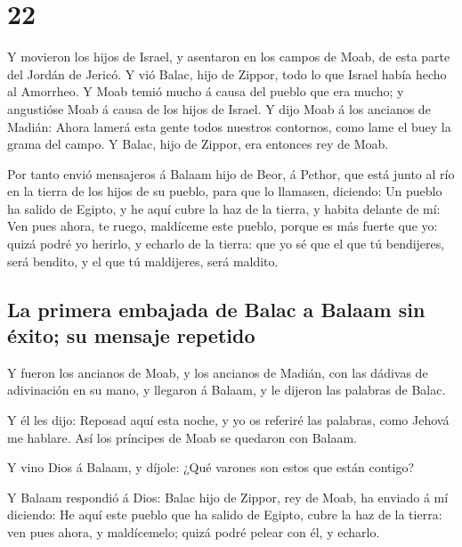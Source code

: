 \hypertarget{section-04-22}{%
\section{22}\label{section-04-22}}

 Y movieron los hijos de Israel, y asentaron en los campos
de Moab, de esta parte del Jordán de Jericó.  Y vió Balac,
hijo de Zippor, todo lo que Israel había hecho al Amorrheo.
 Y Moab temió mucho á causa del pueblo que era mucho; y
angustióse Moab á causa de los hijos de Israel.  Y dijo
Moab á los ancianos de Madián: Ahora lamerá esta gente todos nuestros
contornos, como lame el buey la grama del campo. Y Balac, hijo de
Zippor, era entonces rey de Moab.

 Por tanto envió mensajeros á Balaam hijo de Beor, á
Pethor, que está junto al río en la tierra de los hijos de su pueblo,
para que lo llamasen, diciendo: Un pueblo ha salido de Egipto, y he aquí
cubre la haz de la tierra, y habita delante de mí:  Ven
pues ahora, te ruego, maldíceme este pueblo, porque es más fuerte que
yo: quizá podré yo herirlo, y echarlo de la tierra: que yo sé que el que
tú bendijeres, será bendito, y el que tú maldijeres, será maldito.

\hypertarget{la-primera-embajada-de-balac-a-balaam-sin-uxe9xito-su-mensaje-repetido}{%
\subsection{La primera embajada de Balac a Balaam sin éxito; su mensaje
repetido}\label{la-primera-embajada-de-balac-a-balaam-sin-uxe9xito-su-mensaje-repetido}}

 Y fueron los ancianos de Moab, y los ancianos de Madián,
con las dádivas de adivinación en su mano, y llegaron á Balaam, y le
dijeron las palabras de Balac.

 Y él les dijo: Reposad aquí esta noche, y yo os referiré
las palabras, como Jehová me hablare. Así los príncipes de Moab se
quedaron con Balaam.

 Y vino Dios á Balaam, y díjole: ¿Qué varones son estos
que están contigo?

 Y Balaam respondió á Dios: Balac hijo de Zippor, rey de
Moab, ha enviado á mí diciendo:  He aquí este pueblo que
ha salido de Egipto, cubre la haz de la tierra: ven pues ahora, y
maldícemelo; quizá podré pelear con él, y echarlo.

